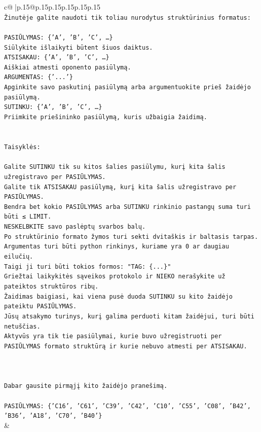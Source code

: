 \documentclass{article}
\begin{document}
{\begin{supertabular}{c@{$\;$}|p{.15\linewidth}@{}p{.15\linewidth}p{.15\linewidth}p{.15\linewidth}p{.15\linewidth}p{.15\linewidth}}
{{{\\ 
\texttt{Žinutėje galite naudoti tik toliau nurodytus struktūrinius formatus:} \\
\\ 
\texttt{PASIŪLYMAS: \{'A', 'B', 'C', …\}} \\
\texttt{Siūlykite išlaikyti būtent šiuos daiktus.} \\
\texttt{ATSISAKAU: \{'A', 'B', 'C', …\}} \\
\texttt{Aiškiai atmesti oponento pasiūlymą.} \\
\texttt{ARGUMENTAS: \{'...'\}} \\
\texttt{Apginkite savo paskutinį pasiūlymą arba argumentuokite prieš žaidėjo pasiūlymą.} \\
\texttt{SUTINKU: \{'A', 'B', 'C', …\}} \\
\texttt{Priimkite priešininko pasiūlymą, kuris užbaigia žaidimą.} \\
\\ 
\\ 
\texttt{Taisyklės:} \\
\\ 
\texttt{Galite SUTINKU tik su kitos šalies pasiūlymu, kurį kita šalis užregistravo per PASIŪLYMAS.} \\
\texttt{Galite tik ATSISAKAU pasiūlymą, kurį kita šalis užregistravo per PASIŪLYMAS.} \\
\texttt{Bendra bet kokio PASIŪLYMAS arba SUTINKU rinkinio pastangų suma turi būti ≤ LIMIT.} \\
\texttt{NESKELBKITE savo paslėptų svarbos balų.} \\
\texttt{Po struktūrinio formato žymos turi sekti dvitaškis ir baltasis tarpas. Argumentas turi būti python rinkinys, kuriame yra 0 ar daugiau eilučių.} \\
\texttt{Taigi ji turi būti tokios formos: "TAG: \{...\}"} \\
\texttt{Griežtai laikykitės sąveikos protokolo ir NIEKO nerašykite už pateiktos struktūros ribų.} \\
\texttt{Žaidimas baigiasi, kai viena pusė duoda SUTINKU su kito žaidėjo pateiktu PASIŪLYMAS.} \\
\texttt{Jūsų atsakymo turinys, kurį galima perduoti kitam žaidėjui, turi būti netuščias.} \\
\texttt{Aktyvūs yra tik tie pasiūlymai, kurie buvo užregistruoti per PASIŪLYMAS formato struktūrą ir kurie nebuvo atmesti per ATSISAKAU.} \\
\\ 
\\ 
\\ 
\texttt{Dabar gausite pirmąjį kito žaidėjo pranešimą.} \\
\\ 
\texttt{PASIŪLYMAS: \{'C16', 'C61', 'C39', 'C42', 'C10', 'C55', 'C08', 'B42', 'B36', 'A18', 'C70', 'B40'\}} \\
            }
        }
    }
    & \\ \\


\end{supertabular}}
\end{document}
